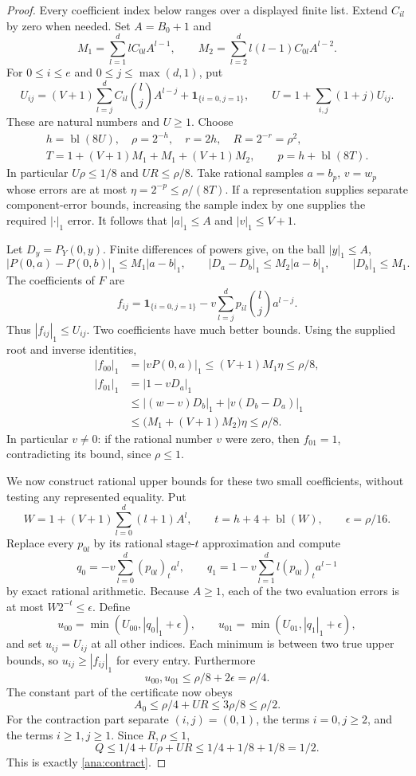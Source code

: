 \begin{proof}
Every coefficient index below ranges over a displayed finite list.
Extend $C_{il}$ by zero when needed.  Set $A=B_0+1$ and
\[
 M_1=\sum_{l=1}^d l C_{0l}A^{l-1},\qquad
 M_2=\sum_{l=2}^d l(l-1)C_{0l}A^{l-2}.
\]
For $0\le i\le e$ and $0\le j\le\max(d,1)$, put
\[
 U_{ij}=(V+1)\sum_{l=j}^d C_{il}\binom lj A^{l-j}
                +\mathbf1_{\{i=0,j=1\}},
 \qquad
 U=1+\sum_{i,j}(1+j)U_{ij}.
\]
These are natural numbers and $U\ge1$.  Choose
\[
 \begin{gathered}
 h=\operatorname{bl}(8U),\quad \rho=2^{-h},\quad r=2h,
 \quad R=2^{-r}=\rho^2,\\
 T=1+(V+1)M_1+M_1+(V+1)M_2,\qquad
 p=h+\operatorname{bl}(8T).
 \end{gathered}
\]
In particular $U\rho\le1/8$ and $UR\le\rho/8$.
Take rational samples $a=b_p$, $v=w_p$ whose errors are at most
$\eta=2^{-p}\le\rho/(8T)$.  If a representation supplies separate
component-error bounds, increasing the sample index by one supplies the
required $|\cdot|_1$ error.  It follows that $|a|_1\le A$ and
$|v|_1\le V+1$.

Let $D_y=P_Y(0,y)$.  Finite differences of powers give, on the ball
$|y|_1\le A$,
\[
 |P(0,a)-P(0,b)|_1\le M_1|a-b|_1,
 \qquad |D_a-D_b|_1\le M_2|a-b|_1,
 \qquad |D_b|_1\le M_1.
\]
The coefficients of $F$ are
\[
 f_{ij}=\mathbf1_{\{i=0,j=1\}}
       -v\sum_{l=j}^d p_{il}\binom lj a^{l-j}.
\]
Thus $|f_{ij}|_1\le U_{ij}$.  Two coefficients have much better
bounds.  Using the supplied root and inverse identities,
\begin{align*}
 |f_{00}|_1
   &=|vP(0,a)|_1
     \le (V+1)M_1\eta\le\rho/8,\\
 |f_{01}|_1
   &=|1-vD_a|_1\\
   &\le |(w-v)D_b|_1+|v(D_b-D_a)|_1\\
   &\le\bigl(M_1+(V+1)M_2\bigr)\eta\le\rho/8.
\end{align*}
In particular $v\ne0$: if the rational number $v$ were zero, then
$f_{01}=1$, contradicting its bound, since $\rho\le1$.

We now construct rational upper bounds for these two small coefficients,
without testing any represented equality.  Put
\[
 W=1+(V+1)\sum_{l=0}^d(l+1)A^l,
 \qquad t=h+4+\operatorname{bl}(W),\qquad \epsilon=\rho/16.
\]
Replace every $p_{0l}$ by its rational stage-$t$ approximation and
compute
\[
 q_0=-v\sum_{l=0}^d(p_{0l})_t a^l,
 \qquad
 q_1=1-v\sum_{l=1}^d l(p_{0l})_t a^{l-1}
\]
by exact rational arithmetic.  Because $A\ge1$, each of the two
evaluation errors is at most $W2^{-t}\le\epsilon$.
Define
\[
 u_{00}=\min(U_{00},|q_0|_1+\epsilon),\qquad
 u_{01}=\min(U_{01},|q_1|_1+\epsilon),
\]
and set $u_{ij}=U_{ij}$ at all other indices.  Each minimum is between
two true upper bounds, so $u_{ij}\ge|f_{ij}|_1$ for every entry.
Furthermore
\[
 u_{00},u_{01}\le \rho/8+2\epsilon=\rho/4.
\]
The constant part of the certificate now obeys
\[
 A_0\le\rho/4+UR\le3\rho/8\le\rho/2.
\]
For the contraction part separate $(i,j)=(0,1)$, the terms $i=0,j\ge2$,
and the terms $i\ge1,j\ge1$.  Since $R,\rho\le1$,
\[
 Q\le1/4+U\rho+UR\le1/4+1/8+1/8=1/2.
\]
This is exactly \eqref{ana:contract}.


\end{proof}
